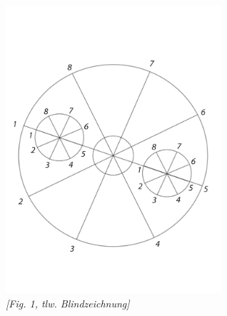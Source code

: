             \newpage
              \begin{center}
              \includegraphics[width=0.6\textwidth]{images/38_20v}
              \\\textit{[Fig. 1, tlw. Blindzeichnung]}
              \end{center}
